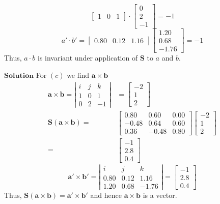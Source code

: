 \documentclass{article}
\begin{document}
\begin{flushleft}
$$\begin{bmatrix}
1 & 0 & 1
\end{bmatrix} \cdot\begin{bmatrix}
0 \\
2 \\
-1
\end{bmatrix}=-1
$$
$$
a' \cdot b'=\begin{bmatrix}
0.80 & 0.12 & 1.16
\end{bmatrix}\begin{bmatrix}
1.20 \\
0.68 \\
-1.76
\end{bmatrix}=-1
$$
Thus, $a \cdot b$ is invariant under application of $\mathbf{S}$ to $a$ and $b$.

$\boxed{\textbf{Solution}}$ For $(c)$ we find $\mathbf{a} \times \mathbf{b}$
$$
\begin{aligned}
\mathbf{a} \times \mathbf{b}=\left|\begin{array}{ccc}
i & j & k \\
1 & 0 & 1 \\
0 & 2 & -1
\end{array}\right| &=\begin{bmatrix}
-2 \\
1 \\
2
\end{bmatrix} \\
\mathbf{S}(\mathbf{a} \times \mathbf{b})=&\begin{bmatrix}
0.80 & 0.60 & 0.00 \\
-0.48 & 0.64 & 0.60 \\
0.36 & -0.48 & 0.80
\end{bmatrix}\begin{bmatrix}
-2 \\
1 \\
2
\end{bmatrix} \\
=&\begin{bmatrix}
-1 \\
2.8 \\
0.4
\end{bmatrix}
\end{aligned}
$$
$$
\mathbf{a}' \times \mathbf{b}'=\left|\begin{array}{ccc}
i & j & k \\
0.80 & 0.12 & 1.16 \\
1.20 & 0.68 & -1.76
\end{array}\right|=\begin{bmatrix}
-1 \\
2.8 \\
0.4
\end{bmatrix}
$$
Thus, $\mathbf{S}(\mathbf{a} \times \mathbf{b})=\mathbf{a}' \times \mathbf{b}'$ and hence $\mathbf{a} \times \mathbf{b}$ is a vector.





\end{flushleft}
\end{document}
